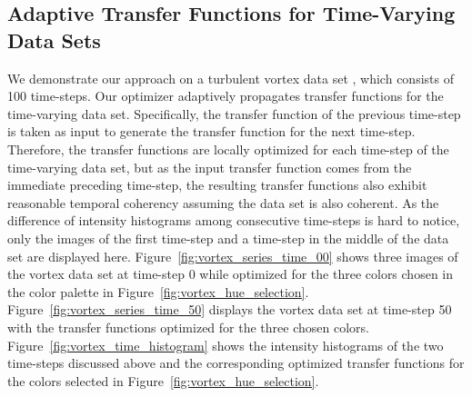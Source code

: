 \subsection{Adaptive Transfer Functions for Time-Varying Data Sets \label{adaptive_transfer_functions_for_time-varying_data_sets}}
We demonstrate our approach on a turbulent vortex data set \cite{website:Ma_repository_2013}, which consists of 100 time-steps. Our optimizer adaptively propagates transfer functions for the time-varying data set. Specifically, the transfer function of the previous time-step is taken as input to generate the transfer function for the next time-step.
Therefore, the transfer functions are locally optimized for each time-step of the time-varying data set, but as the input transfer function comes from the immediate preceding time-step, the resulting transfer functions also exhibit reasonable temporal coherency assuming the data set is also coherent.
As the difference of intensity histograms among consecutive time-steps is hard to notice, only the images of the first time-step and a time-step in the middle of the data set are displayed here.
Figure~\ref{fig:vortex_series_time_00} shows three images of the vortex data set at time-step 0 while optimized for the three colors chosen in the color palette in Figure~\ref{fig:vortex_hue_selection}.
Figure~\ref{fig:vortex_series_time_50} displays the vortex data set at time-step 50 with the transfer functions optimized for the three chosen colors.
Figure~\ref{fig:vortex_time_histogram} shows the intensity histograms of the two time-steps discussed above and the corresponding optimized transfer functions for the colors selected in Figure~\ref{fig:vortex_hue_selection}.

